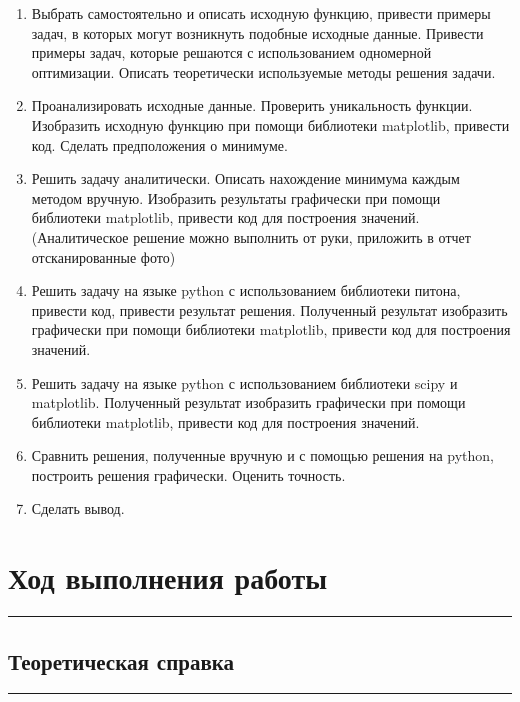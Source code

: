 \documentclass[a4paper, 14pt]{extarticle}
\begin{document}
\begin{enumerate}
    \item Выбрать самостоятельно и описать исходную функцию, привести примеры задач, в которых могут возникнуть подобные исходные данные. Привести примеры задач, которые решаются с использованием одномерной оптимизации. Описать теоретически используемые методы решения задачи.

    \item Проанализировать исходные данные. Проверить уникальность функции. Изобразить исходную функцию при помощи библиотеки matplotlib, привести код. Сделать предположения о минимуме.

    \item Решить задачу аналитически. Описать нахождение минимума каждым методом вручную. Изобразить результаты графически при помощи библиотеки matplotlib, привести код для построения значений. (Аналитическое решение можно выполнить от руки, приложить в отчет отсканированные фото)

    \item Решить задачу на языке python с использованием библиотеки питона, привести код, привести результат решения. Полученный результат изобразить графически при помощи библиотеки matplotlib, привести код для построения значений.

    \item Решить задачу на языке python с использованием библиотеки scipy и matplotlib. Полученный результат изобразить графически при помощи библиотеки matplotlib, привести код для построения значений.

    \item Сравнить решения, полученные вручную и с помощью решения на python, построить решения графически. Оценить точность.

    \item Сделать вывод.
\end{enumerate}

\section*{Ход выполнения работы}\vspace{-20pt}\rule{\linewidth}{0.1mm}
\vspace{-30pt}
\subsection*{Теоретическая справка}\vspace{-20pt}\rule{\linewidth}{0.1mm}
\end{document}

